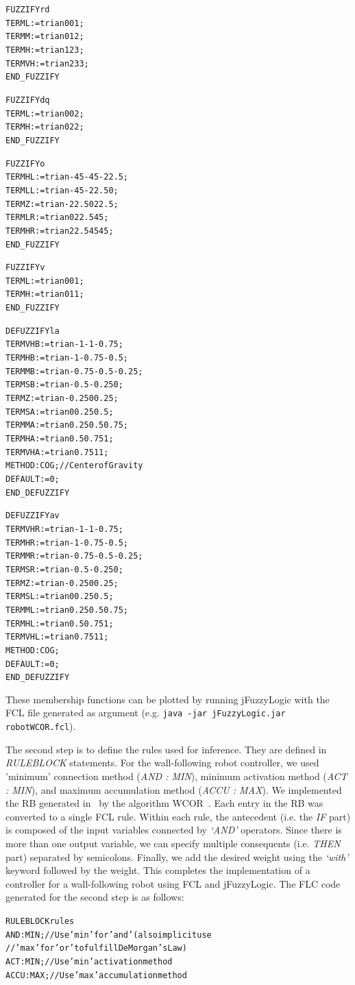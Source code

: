 \documentclass[11pt,twoside]{article}
\begin{document}
\begin{multicols}{2}
\begin{scriptsize}
\begin{alltt}
FUZZIFY rd
	TERM L  := trian 0 0 1;
	TERM M  := trian 0 1 2;
	TERM H  := trian 1 2 3;
	TERM VH := trian 2 3 3;
END\_FUZZIFY

FUZZIFY dq
	TERM L := trian 0 0 2;
	TERM H := trian 0 2 2;
END\_FUZZIFY

FUZZIFY o
	TERM HL := trian -45 -45 -22.5;
	TERM LL := trian -45 -22.5 0;
	TERM Z  := trian -22.5 0 22.5;
	TERM LR := trian 0 22.5 45;
	TERM HR := trian 22.5 45 45;
END\_FUZZIFY

FUZZIFY v
	TERM L := trian 0 0 1;
	TERM H := trian 0 1 1;
END\_FUZZIFY

DEFUZZIFY la
	TERM VHB := trian -1 -1 -0.75;
	TERM HB  := trian -1 -0.75 -0.5;
	TERM MB  := trian -0.75 -0.5 -0.25;
	TERM SB  := trian -0.5 -0.25 0;
	TERM Z   := trian -0.25 0 0.25;
	TERM SA  := trian 0 0.25 0.5;
	TERM MA  := trian 0.25 0.5 0.75;
	TERM HA  := trian 0.5 0.75 1;
	TERM VHA := trian 0.75 1 1;
	METHOD : COG;			// Center of Gravity
	DEFAULT := 0;
END\_DEFUZZIFY

DEFUZZIFY av
	TERM VHR := trian -1 -1 -0.75;
	TERM HR  := trian -1 -0.75 -0.5;
	TERM MR  := trian -0.75 -0.5 -0.25;
	TERM SR  := trian -0.5 -0.25 0;
	TERM Z   := trian -0.25 0 0.25;
	TERM SL  := trian 0 0.25 0.5;
	TERM ML  := trian 0.25 0.5 0.75;
	TERM HL  := trian 0.5 0.75 1;
	TERM VHL := trian 0.75 1 1;
	METHOD : COG;
	DEFAULT := 0;
END\_DEFUZZIFY
\end{alltt}
\end{scriptsize}
\vspace*{5pt}
These membership functions can be plotted by running jFuzzyLogic with the FCL file generated as argument (e.g. \texttt{java -jar jFuzzyLogic.jar robotWCOR.fcl}). 

The second step is to define the rules used for inference. They are defined in \textit{RULEBLOCK} statements. For the wall-following robot controller, we used 'minimum' connection method (\textit{AND : MIN}), minimum activation method (\textit{ACT : MIN}), and maximum accumulation method (\textit{ACCU : MAX}).  We implemented the RB generated in~\cite{Mucientes2010} by the algorithm WCOR~\cite{Alc06}. Each entry in the RB was converted to a single FCL rule. Within each rule, the antecedent (i.e. the \textit{IF} part) is composed of the input variables connected by \textit{`AND'} operators. Since there is more than one output variable, we can specify multiple consequents (i.e. \textit{THEN} part) separated by semicolons. Finally, we add the desired weight using the \textit{`with'} keyword followed by the weight. This completes the implementation of a controller for a wall-following robot using FCL and jFuzzyLogic. The FLC code generated for the second step is as follows:
\vspace*{5pt}
\begin{scriptsize}
\begin{alltt}
RULEBLOCK rules
AND  : MIN;			// Use 'min' for 'and' (also implicit use 
            //'max' for 'or' to fulfill DeMorgan's Law)
ACT  : MIN;			// Use 'min' activation method
ACCU : MAX;			// Use 'max' accumulation method


\end{alltt}
\end{scriptsize}
\end{multicols}
\end{document}
